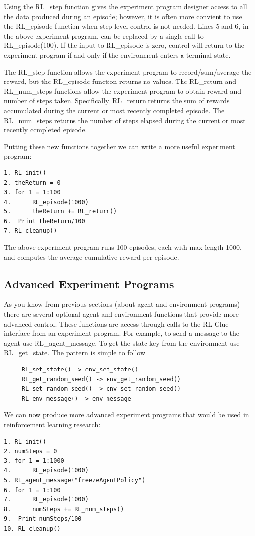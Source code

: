 \documentclass[11pt]{article}
\begin{document}
Using the RL\_step function gives the experiment program designer access to all the data produced during an episode; however, it is often more convient to use the RL\_episode function when step-level control is not needed. Lines 5 and 6, in the above experiment program, can be replaced by a single call to RL\_episode(100). If the input to RL\_episode is zero, control will return to the experiment program if and only if the environment enters a terminal state.

The RL\_step function allows the experiment program to record/sum/average the reward, but the RL\_episode function returns no values. The RL\_return and RL\_num\_steps functions allow the experiment program to obtain reward and number of steps taken. Specifically, RL\_return returns the sum of rewards accumulated during the current or most recently completed episode. The RL\_num\_steps returns the number of steps elapsed during the current or most recently completed episode. 

Putting these new functions together we can write a more useful experiment program:
\begin{verbatim}
1. RL_init()
2. theReturn = 0
3. for 1 = 1:100
4.      RL_episode(1000)
5.      theReturn += RL_return()
6.  Print theReturn/100
7. RL_cleanup()
\end{verbatim}
The above experiment program runs 100 episodes, each with max length 1000, and computes the average cumulative reward per episode.
\subsection{Advanced Experiment Programs}
\label{expp2}


As you know from previous sections (about agent and environment programs) there are several optional agent and environment functions that provide more advanced control. These functions are access through calls to the RL-Glue interface from an experiment program. For example, to send a message to the agent use RL\_agent\_message. To get the state key from the environment use RL\_get\_state. The pattern is simple to follow:
\begin{verbatim}
     RL_set_state() -> env_set_state()
     RL_get_random_seed() -> env_get_random_seed()
     RL_set_random_seed() -> env_set_random_seed()
     RL_env_message() -> env_message
\end{verbatim}
We can now produce more advanced experiment programs that would be used in reinforcement learning research:
\begin{verbatim}
1. RL_init()
2. numSteps = 0
3. for 1 = 1:1000
4.      RL_episode(1000)
5. RL_agent_message("freezeAgentPolicy")
6. for 1 = 1:100
7.      RL_episode(1000)
8.      numSteps += RL_num_steps()
9.  Print numSteps/100
10. RL_cleanup()
\end{verbatim}
\end{document}
